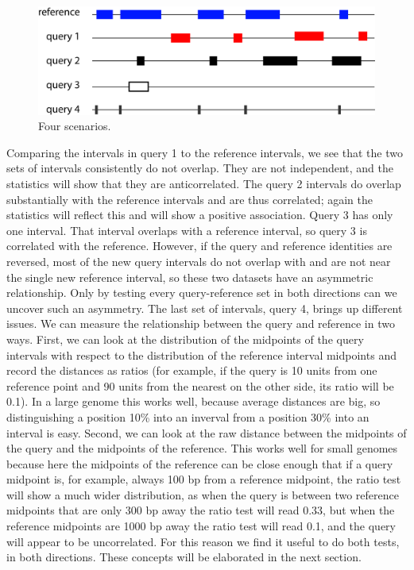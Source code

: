 \documentclass{article}
\begin{document}
\begin{figure}[h]
	\centering\includegraphics[scale=\picscale]{png/fig4}
	\caption{Four scenarios.}
\end{figure}
Comparing the intervals in query 1 to the reference intervals, we see that the two sets of intervals consistently do not overlap. They are not independent, and the statistics will show that they are anticorrelated. The query 2 intervals do overlap substantially with the reference intervals and are thus correlated; again the statistics will reflect this and will show a positive association. Query 3 has only one interval. That interval overlaps with a reference interval, so query 3 is correlated with the reference. However, if the query and reference identities are reversed, most of the new query intervals do not overlap with and are not near the single new reference interval, so these two datasets have an asymmetric relationship. Only by testing every query-reference set in both directions can we uncover such an asymmetry. The last set of intervals, query 4, brings up different issues. We can measure the relationship between the query and reference in two ways. First, we can look at the distribution of the midpoints of the query intervals with respect to the distribution of the reference interval midpoints and record the distances as ratios (for example, if the query is 10 units from one reference point and 90 units from the nearest on the other side, its ratio will be 0.1). In a large genome this works well, because average distances are big, so distinguishing a position 10\% into an inverval from a position 30\%
 into an interval is easy. Second, we can look at the raw distance between the midpoints of the query and the midpoints of the reference. This works well for small genomes because here the midpoints of the reference can be close enough that if a query midpoint is, for example, always 100 bp from a reference midpoint, the ratio test will show a much wider distribution, as when the query is between two reference midpoints that are only 300 bp away the ratio test will read 0.33, but when the reference midpoints are 1000 bp away the ratio test will read 0.1, and the query will appear to be uncorrelated. For this reason we find it useful to do both tests, in both directions. These concepts will be elaborated in the next section.
\end{document}
